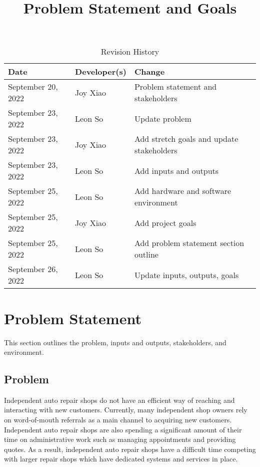 \documentclass{article}
\title{Problem Statement and Goals\\\progname}
\author{\authname}
\date{}
\begin{document}
\maketitle

\begin{table}[hp]
\caption{Revision History} \label{TblRevisionHistory}
\begin{tabularx}{\textwidth}{llX}
\toprule
\textbf{Date} & \textbf{Developer(s)} & \textbf{Change}\\
\midrule
September 20, 2022 & Joy Xiao & Problem statement and stakeholders\\
September 23, 2022 & Leon So & Update problem\\
September 23, 2022 & Joy Xiao & Add stretch goals and update stakeholders\\
September 23, 2022 & Leon So & Add inputs and outputs\\
September 25, 2022 & Leon So & Add hardware and software environment\\
September 25, 2022 & Joy Xiao & Add project goals\\
September 25, 2022 & Leon So & Add problem statement section outline\\
September 26, 2022 & Leon So & Update inputs, outputs, goals\\
\bottomrule
\end{tabularx}
\end{table}

\section{Problem Statement}
This section outlines the problem, inputs and outputs, stakeholders, and environment.

\subsection{Problem}
Independent auto repair shops do not have an efficient way of reaching and interacting with new customers.
Currently, many independent shop owners rely on word-of-mouth referrals as a main channel to acquiring new customers. 
Independent auto repair shops are also spending a significant amount of their time on administrative work such as 
managing appointments and providing quotes. As a result, independent auto repair shops have a difficult time 
competing with larger repair shops which have dedicated systems and services in place.\\
\end{document}
